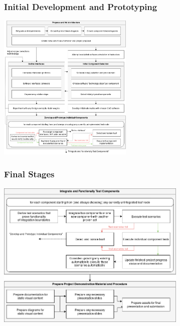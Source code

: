 \documentclass{beamer}
\begin{document}
\begin{frame}
\frametitle{Initial Development and Prototyping}
\begin{center}
\includegraphics[height=200pt,width=\linewidth,keepaspectratio]{../src/im/workflow_1}
\end{center}
\end{frame}

\begin{frame}
\frametitle{Final Stages}
\begin{center}
\includegraphics[height=200pt,width=\linewidth,keepaspectratio]{../src/im/workflow_2}
\end{center}
\end{frame}
\end{document}
